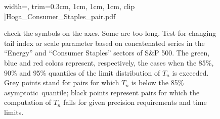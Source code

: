 \documentclass[11pt,a4]{amsart}
\newcommand{\red}{\color{darkred}}
\newcommand{\asy}{asymptotic}
\newcommand{\1}{{\mathbf 1}}
\begin{document}
\begin{figure}[htb!]
\begin{minipage}{0.5\linewidth}
      width=\textwidth,
      trim={0.3cm, 1cm, 1cm, 1cm}, clip
    ]{Hoga_Consumer_Staples_pair.pdf}
  \end{minipage}
  \caption{{\red check the symbols on the axes. Some are too long.} Test for changing tail index or scale parameter based on concatenated series in the ``Energy'' and
    ``Consumer Staples'' sectors of
    S\&P 500. The green, blue and red colors represent, respectively, the cases when  
    the 85\%, 90\% and 95\% quantiles of the limit distribution of $T_n$ is exceeded.
    Grey points stand for pairs for which $T_n$ is below
    the 85\% \asy\ quantile;
    black points represent pairs for which
    the computation of $T_n$ fails for given precision
    requirements and time limits.}
  \label{fig:Hoga_pair}
\end{figure}
\end{document}
